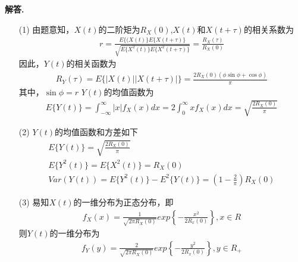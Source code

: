 \documentclass[12pt, a4paper, oneside]{ctexart}
\newenvironment{solution}{\par\noindent\textbf{解答. }}{\par}
\begin{document}
\begin{solution}
    \begin{itemize}
        \item [(1)]
        由题意知，$X(t)$的二阶矩为$R_X(0)$,$X(t)$和$X(t+\tau)$的相关系数为
        \begin{align*}
            r=
            \frac{
                E\{(X(t)\}
                E\{X(t+\tau)\}
                }
                {
                    \sqrt{
                        E\{
                            X^2(t)       
                        \}
                        E\{
                            X^2(t+\tau)       
                        \}
                    }
                }
            =\frac{R_X(\tau)}{R_X(0)}
        \end{align*}
        因此，$Y(t)$的相关函数为
        \begin{align*}
            R_Y(\tau)
            =
            E\{
                |X(t)| 
                |X(t+\tau)|    
            \}
            =
            \frac{2R_X(0)(\phi \sin \phi + \cos\phi)}{\pi}
        \end{align*}
        其中，$\sin \phi = r$
        $Y(t)$的均值函数为
        \begin{align*}
            E\{Y(t)\}
            =
            \int_{-\infty}^{\infty}{
                |x|f_X(x)dx
            }
            =
            2 \int_{0}^{\infty}{
                xf_X(x)dx
            }
            =
            \sqrt{
                \frac{2R_X(0)}{\pi}
            }
        \end{align*}
        \item [(2)]
        $Y(t)$的均值函数和方差如下
        \begin{align*}
            E\{Y(t)\}
            =
            \sqrt{
                \frac{2R_X(0)}{\pi}
            }
            \\
            E\{Y^2(t)\}=E\{X^2(t)\}=R_X(0)
            \\
            Var(Y(t))
            =
            E\{Y^2(t)\}
            -
            E^2\{Y(t)\}
            =
            \left(
                1-\frac{2}{\pi}
            \right)
            R_X(0)
        \end{align*}
        \item [(3)]
        易知$X(t)$的一维分布为正态分布，即
        \begin{align*}
            f_X(x)=\frac{1}{\sqrt{2\pi R_X(0)}}
            exp\left\{
                -\frac{x^2}{2R_x(0)}
            \right\}
            ,x\in R
        \end{align*}
        则$Y(t)$的一维分布为
        \begin{align*}
            f_Y(y)=\frac{2}{\sqrt{2\pi R_X(0)}}
            exp\left\{
                -\frac{y^2}{2R_x(0)}
            \right\}
            ,y\in R_+  
        \end{align*}
    \end{itemize}
\end{solution}
\end{document}
